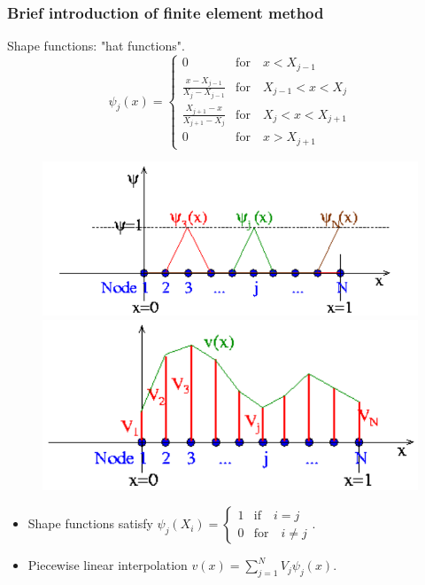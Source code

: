 \documentclass{beamer}
\newcommand{\bi}{\begin{itemize}}
\newcommand{\ei}{\end{itemize}}
\begin{document}



\begin{frame}
	\frametitle{Brief introduction of finite element method}
	\begin{overlayarea}{\textwidth}{\textheight}
\vspace{-0.2cm}\small	Shape functions: "hat functions".
$$\psi_j(x)=
\begin{cases}
	0 & \text{for}\quad x<X_{j-1} \\
	\frac{x-X_{j-1}}{X_{j}-X_{j-1}} & \text{for}\quad X_{j-1}<x<X_{j}\\
	\frac{X_{j+1}-x}{X_{j+1}-X_{j}} & \text{for}\quad X_{j}<x<X_{j+1} \\
	0 & \text{for}\quad x>X_{j+1}
\end{cases}$$\vspace{-0.6cm}
\begin{figure}[htb]
	\begin{minipage}[t]{0.49\linewidth}
		\centering
		\includegraphics[scale=0.22]{plots/finite1.png}
	\end{minipage}
	\begin{minipage}[t]{0.49\linewidth}
		\centering
		\includegraphics[scale=0.22]{plots/finite2.png}
	\end{minipage}
\end{figure}\vspace{-0.2cm}
\bi
\item Shape functions satisfy $\psi_j(X_i)=
\begin{cases}
	1 & \text{if}\quad i=j \\
	0 & \text{for}\quad i\neq j
\end{cases}.$
\item Piecewise linear interpolation $v(x)=\sum^N_{j=1} V_j \psi_j(x)$.
\ei
		\end{overlayarea}
	\end{frame}
	
\end{document}
